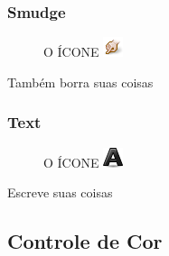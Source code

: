\documentclass[12pt,onecolumn]{article}
\begin{document}
    \subsubsection{Smudge}
      \begin{figure}[H]
        O ÍCONE
        \includegraphics{gimp-icons/stock-tool-smudge-22.png}
        \label{fig:smudge}
      \end{figure}
      Também borra suas coisas
      
    \subsubsection{Text}
      \begin{figure}[H]
        O ÍCONE
        \includegraphics{gimp-icons/stock-tool-text-22.png}
        \label{fig:text}
      \end{figure}
      Escreve suas coisas




  \subsection{Controle de Cor}
\end{document}
